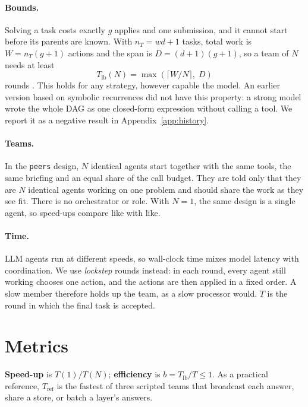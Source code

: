 \documentclass[10pt,twocolumn]{article}
\newcommand{\Tlb}{T_{\mathrm{lb}}}
\newcommand{\Tref}{T_{\mathrm{ref}}}
\begin{document}
\paragraph{Bounds.}
Solving a task costs exactly $g$ applies and one submission, and it cannot start before its parents are known. With $n_T = wd+1$ tasks, total work is $W = n_T(g+1)$ actions and the span is $D = (d+1)(g+1)$, so a team of $N$ needs at least
\begin{equation}
\Tlb(N) = \max\left(\lceil W/N \rceil,\; D\right)
\end{equation}
rounds \citep{brent1974}. This holds for any strategy, however capable the model.
An earlier version based on symbolic recurrences did not have this property: a strong model wrote the whole DAG as one closed-form expression without calling a tool. We report it as a negative result in Appendix~\ref{app:history}.

\paragraph{Teams.}
In the \texttt{peers} design, $N$ identical agents start together with the same tools, the same briefing and an equal share of the call budget. They are told only that they are $N$ identical agents working on one problem and should share the work as they see fit. There is no orchestrator or role. With $N=1$, the same design is a single agent, so speed-ups compare like with like.

\paragraph{Time.}
LLM agents run at different speeds, so wall-clock time mixes model latency with coordination.
We use \emph{lockstep} rounds instead: in each round, every agent still working chooses one action, and the actions are then applied in a fixed order.
A slow member therefore holds up the team, as a slow processor would.
$T$ is the round in which the final task is accepted.

\section{Metrics}
\label{sec:metrics}

\textbf{Speed-up} is $T(1)/T(N)$; \textbf{efficiency} is $b = \Tlb/T \le 1$.
As a practical reference, $\Tref$ is the fastest of three scripted teams that broadcast each answer, share a store, or batch a layer's answers.
\end{document}
